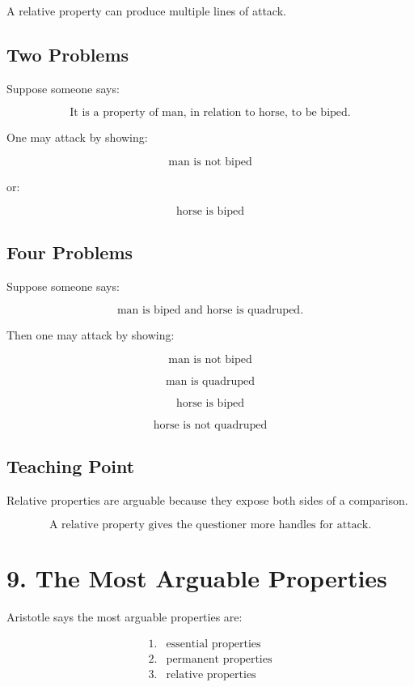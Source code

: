 \documentclass[12pt]{article}
\begin{document}
A relative property can produce multiple lines of attack.

\subsection*{Two Problems}

Suppose someone says:

\[
\text{It is a property of man, in relation to horse, to be biped.}
\]

One may attack by showing:

\[
\text{man is not biped}
\]

or:

\[
\text{horse is biped}
\]

\subsection*{Four Problems}

Suppose someone says:

\[
\text{man is biped and horse is quadruped.}
\]

Then one may attack by showing:

\[
\text{man is not biped}
\]

\[
\text{man is quadruped}
\]

\[
\text{horse is biped}
\]

\[
\text{horse is not quadruped}
\]

\subsection*{Teaching Point}

Relative properties are arguable because they expose both sides of a
comparison.

\[
\boxed{
\text{A relative property gives the questioner more handles for attack.}
}
\]

\section*{9. The Most Arguable Properties}

Aristotle says the most arguable properties are:

\[
\begin{array}{ll}
1. & \text{essential properties} \\
2. & \text{permanent properties} \\
3. & \text{relative properties}
\end{array}
\]
\end{document}
